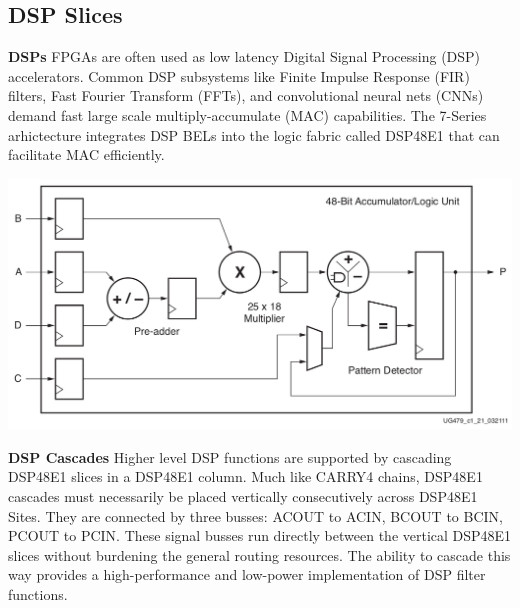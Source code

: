 \documentclass{article}
\begin{document}
\begin{multicols}{2}
    \newpage
    \subsection{DSP Slices}

    \textbf{DSPs} \quad 
        FPGAs are often used as low latency Digital Signal Processing (DSP) accelerators. 
        Common DSP subsystems like Finite Impulse Response (FIR) filters, Fast Fourier Transform (FFTs), and convolutional neural nets (CNNs) demand fast large scale multiply-accumulate (MAC) capabilities. 
        The 7-Series arhictecture integrates DSP BELs into the logic fabric called DSP48E1 that can facilitate MAC efficiently. 

        {
            \centering
            \includegraphics[width=\columnwidth]{figures/dsp_diagram.png}
            \label{dsp_diagram}
        }
        \vspace{0.5cm}

    \textbf{DSP Cascades} \quad 
        Higher level DSP functions are supported by cascading DSP48E1 slices in a DSP48E1 column.
        Much like CARRY4 chains, DSP48E1 cascades must necessarily be placed vertically consecutively across DSP48E1 Sites. 
        They are connected by three busses: ACOUT to ACIN, BCOUT to BCIN, PCOUT to PCIN.
        These signal busses run directly between the vertical DSP48E1 slices without burdening the general routing resources. 
        The ability to cascade this way provides a high-performance and low-power implementation of DSP filter functions. 


\end{multicols}
\end{document}
